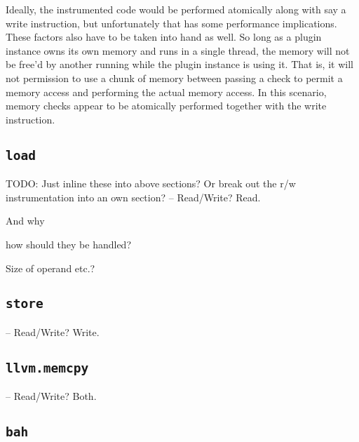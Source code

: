 Ideally, the instrumented code would be performed atomically along with say a
write instruction, but unfortunately that has some performance implications.
These factors also have to be taken into hand as well. So long as a plugin
instance owns its own memory and runs in a single thread, the memory will not be
free'd by another running while the plugin instance is using it. That is, it
will not permission to use a chunk of memory between passing a check to permit a
memory access and performing the actual memory access. In this scenario, memory
checks appear to be atomically performed together with the write instruction.

\subsection {\texttt{load}}

TODO: Just inline these into above sections? Or break out the r/w
instrumentation into an own section?
-- Read/Write? Read.

And why

how should they be handled?

Size of operand etc.?

\subsection {\texttt{store}}

-- Read/Write? Write.

\subsection {\texttt{llvm.memcpy}}

-- Read/Write? Both.

\subsection {\texttt{bah}}

